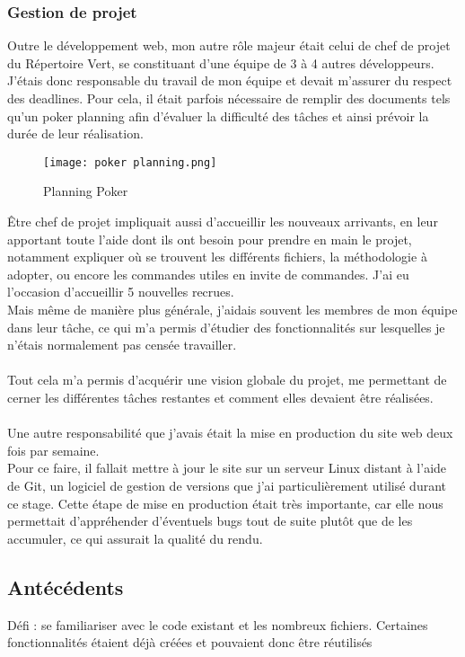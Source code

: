 \subsubsection{Gestion de projet}

Outre le développement web, mon autre rôle majeur était celui de chef de projet du Répertoire Vert, se constituant d'une équipe de 3 à 4 autres développeurs.
J'étais donc responsable du travail de mon équipe et devait m'assurer du respect des deadlines. Pour cela, il était parfois nécessaire de remplir des documents tels qu'un poker planning afin d'évaluer la difficulté des tâches et ainsi prévoir la durée de leur réalisation.
\begin{figure}[H]
    \centering
    \texttt{[image: poker planning.png]}
    \caption{Planning Poker}
\end{figure}

Être chef de projet impliquait aussi d'accueillir les nouveaux arrivants, en leur apportant toute l'aide dont ils ont besoin pour prendre en main le projet, notamment expliquer où se trouvent les différents fichiers, la méthodologie à adopter, ou encore les commandes utiles en invite de commandes. J'ai eu l'occasion d'accueillir 5 nouvelles recrues.
\\Mais même de manière plus générale, j'aidais souvent les membres de mon équipe dans leur tâche, ce qui m'a permis d'étudier des fonctionnalités sur lesquelles je n'étais normalement pas censée travailler.
\\\\
Tout cela m'a permis d'acquérir une vision globale du projet, me permettant de cerner les différentes tâches restantes et comment elles devaient être réalisées.
\\\\
Une autre responsabilité que j'avais était la mise en production du site web deux fois par semaine. 
\\Pour ce faire, il fallait mettre à jour le site sur un serveur Linux distant à l'aide de Git, un logiciel de gestion de versions que j'ai particulièrement utilisé durant ce stage. Cette étape de mise en production était très importante, car elle nous permettait d'appréhender d'éventuels bugs tout de suite plutôt que de les accumuler, ce qui assurait la qualité du rendu.


\pagebreak
\subsection{Antécédents}
Défi : se familiariser avec le code existant et les nombreux fichiers. Certaines fonctionnalités étaient déjà créées et pouvaient donc être réutilisés
\pagebreak
